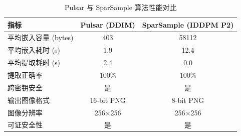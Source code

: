 \begin{table}[htb!]
    \caption{Pulsar 与 SparSample 算法性能对比}
    \centering
    \begin{tabular}{lcc}
        \hline
        \textbf{指标} & \textbf{Pulsar (DDIM)} & \textbf{SparSample (IDDPM P2)} \\
        \hline
        平均嵌入容量 (bytes) & 403 & 58112 \\
        平均嵌入耗时 (s) & 1.9 & 12.4 \\
        平均提取耗时 (s) & 2.4 & 0.0 \\
        提取正确率 & 100\% & 100\% \\
        跨密钥安全 & 是 & 是 \\
        输出图像格式 & 16-bit PNG & 8-bit PNG \\
        图像分辨率 & 256$\times$256 & 256$\times$256 \\
        可证安全性 & 是 & 是 \\
        \hline
    \end{tabular}
    \label{tab:algo_comparison}
\end{table}